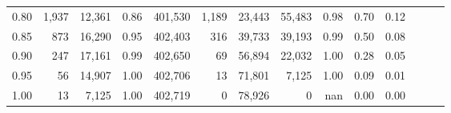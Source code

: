 \begin{tabular}{rrrrrrrrrrrrrr}
0.80 &   1,937 &  12,361 &  0.86 &  401,530 &    1,189 &  23,443 &  55,483 &  0.98 &  0.70 &      0.12 \\
0.85 &     873 &  16,290 &  0.95 &  402,403 &      316 &  39,733 &  39,193 &  0.99 &  0.50 &      0.08 \\
0.90 &     247 &  17,161 &  0.99 &  402,650 &       69 &  56,894 &  22,032 &  1.00 &  0.28 &      0.05 \\
0.95 &      56 &  14,907 &  1.00 &  402,706 &       13 &  71,801 &   7,125 &  1.00 &  0.09 &      0.01 \\
1.00 &      13 &   7,125 &  1.00 &  402,719 &        0 &  78,926 &       0 &   nan &  0.00 &      0.00 \\
\bottomrule
\end{tabular}
